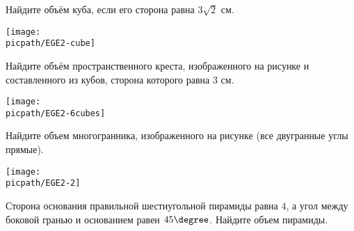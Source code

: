 \begin{class}[number=9]
\begin{listofex}
		
		
		
	\end{listofex}
\end{class}


\begin{class}[number=10]
	\begin{listofex}
		\item 
		\begin{minipage}[t]{\bodywidth}
			Найдите объём куба, если его сторона равна \(3\sqrt{2}\) см.
		\end{minipage}
		\hspace{0.02\linewidth}
		\begin{minipage}[t]{\picwidth}
			\texttt{[image: \\picpath/EGE2-cube]}
		\end{minipage}
		\item 
		\begin{minipage}[t]{\bodywidth}
			Найдите объём пространственного креста, изображенного на рисунке и составленного из кубов, сторона которого равна \(3\) см.
		\end{minipage}
		\hspace{0.02\linewidth}
		\begin{minipage}[t]{\picwidth}
			\texttt{[image: \\picpath/EGE2-6cubes]}
		\end{minipage}
		\item 
		\begin{minipage}[t]{\bodywidth}
			Найдите объем многогранника, изображенного на рисунке (все двугранные углы прямые).
		\end{minipage}
		\hspace{0.02\linewidth}
		\begin{minipage}[t]{\picwidth}
			\texttt{[image: \\picpath/EGE2-2]}
		\end{minipage}
		\item Сторона основания правильной шестиугольной пирамиды равна \(4\), а угол между боковой гранью и основанием равен \(45\degree \). Найдите объем пирамиды.

\end{listofex}
\end{class}
